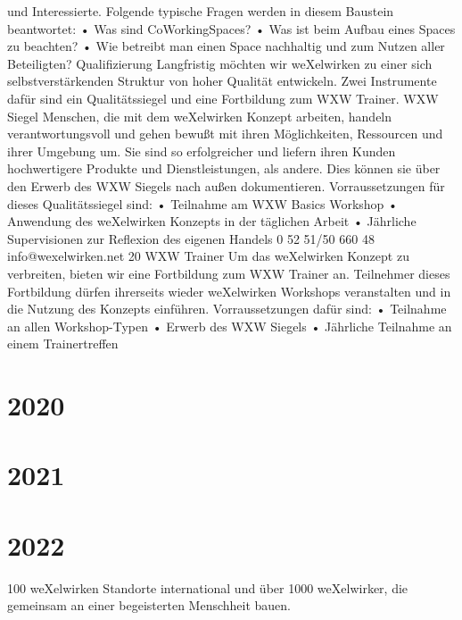 und Interessierte. Folgende typische Fragen werden in diesem Baustein beantwortet:
•
Was sind CoWorkingSpaces?
•
Was ist beim Aufbau eines Spaces zu beachten?
•
Wie betreibt man einen Space nachhaltig und zum Nutzen aller Beteiligten?
Qualifizierung
Langfristig möchten wir weXelwirken zu einer sich selbstverstärkenden Struktur von hoher Qualität 
entwickeln. Zwei Instrumente dafür sind ein Qualitätssiegel und eine Fortbildung zum WXW Trainer.
WXW Siegel
Menschen, die mit dem weXelwirken Konzept arbeiten, handeln verantwortungsvoll und gehen bewußt 
mit ihren Möglichkeiten, Ressourcen und ihrer Umgebung um. Sie sind so erfolgreicher und liefern 
ihren Kunden hochwertigere Produkte und Dienstleistungen, als andere. Dies können sie über den 
Erwerb des WXW Siegels nach außen dokumentieren. Vorraussetzungen für dieses Qualitätssiegel sind:
•
Teilnahme am WXW Basics Workshop
•
Anwendung des weXelwirken Konzepts in der täglichen Arbeit
•
Jährliche Supervisionen zur Reflexion des eigenen Handels   
0 52 51/50 660 48
info@wexelwirken.net
20
WXW Trainer
Um das weXelwirken Konzept zu verbreiten, bieten wir eine Fortbildung zum WXW Trainer an. 
Teilnehmer dieses Fortbildung dürfen ihrerseits wieder weXelwirken Workshops veranstalten und in die 
Nutzung des Konzepts einführen. Vorraussetzungen dafür sind:
•
Teilnahme an allen Workshop-Typen
•
Erwerb des WXW Siegels
•
Jährliche Teilnahme an einem Trainertreffen
  \section{2020}
  \section{2021}
  \section{2022}
100 weXelwirken Standorte international und über 1000 weXelwirker, die gemeinsam an einer begeisterten Menschheit bauen.
